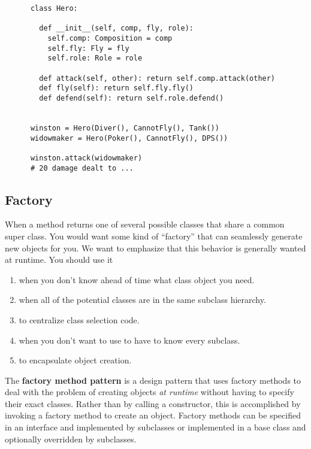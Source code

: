 \begin{example}[Overwatch]
    \begin{lstlisting}
      class Hero: 

        def __init__(self, comp, fly, role): 
          self.comp: Composition = comp 
          self.fly: Fly = fly 
          self.role: Role = role 

        def attack(self, other): return self.comp.attack(other)
        def fly(self): return self.fly.fly() 
        def defend(self): return self.role.defend()


      winston = Hero(Diver(), CannotFly(), Tank()) 
      widowmaker = Hero(Poker(), CannotFly(), DPS()) 

      winston.attack(widowmaker) 
      # 20 damage dealt to ...
    \end{lstlisting}
  \end{example}

\subsection{Factory} 

  When a method returns one of several possible classes that share a common super class. You would want some kind of ``factory'' that can seamlessly generate new objects for you. We want to emphasize that this behavior is generally wanted at runtime. You should use it 
  \begin{enumerate}
    \item when you don't know ahead of time what class object you need. 
    \item when all of the potential classes are in the same subclass hierarchy. 
    \item to centralize class selection code. 
    \item when you don't want to use to have to know every subclass. 
    \item to encapsulate object creation. 
  \end{enumerate}

  \begin{definition}
    The \textbf{factory method pattern} is a design pattern that uses factory methods to deal with the problem of creating objects \textit{at runtime} without having to specify their exact classes. Rather than by calling a constructor, this is accomplished by invoking a factory method to create an object. Factory methods can be specified in an interface and implemented by subclasses or implemented in a base class and optionally overridden by subclasses.
  \end{definition}


